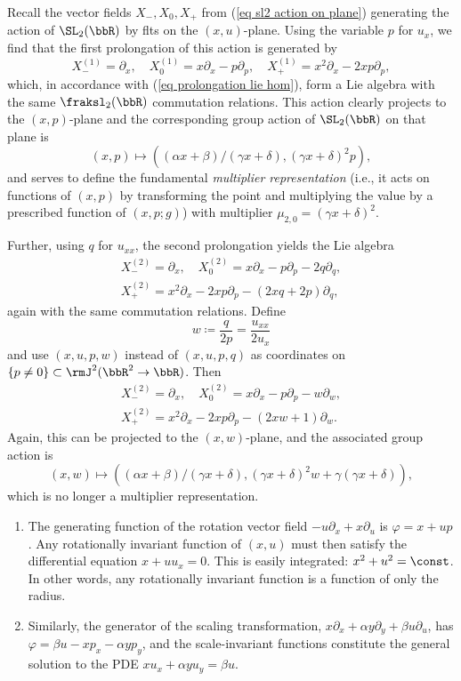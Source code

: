 \begin{example}
    Recall the vector fields $X_-,X_0,X_+$ from (\ref{eq sl2 action on plane}) generating the action of $\SL_2(\bbR)$ by \glspl{flt} on the $(x,u)$-plane. Using the variable $p$ for $u_x$, we find that the first prolongation of this action is generated by 
    \[X_-^{(1)}=\partial_x,\quad X_0^{(1)}=x\partial_x-p\partial_p,\quad X_+^{(1)}=x^2\partial_x-2xp\partial_p,\]
    which, in accordance with (\ref{eq prolongation lie hom}), form a Lie algebra with the same $\fraksl_2(\bbR)$ commutation relations. This action clearly projects to the $(x,p)$-plane and the corresponding group action of $\SL_2(\bbR)$ on that plane is 
    \[(x,p)\mapsto ((\alpha x+\beta)/(\gamma x+\delta),(\gamma x+\delta)^2p),\]
    and serves to define the fundamental \emph{multiplier representation} (i.e., it acts on functions of $(x,p)$ by transforming the point and multiplying the value by a prescribed function of $(x,p;g)$) with multiplier $\mu_{2,0}=(\gamma x+\delta)^2$.

    Further, using $q$ for $u_{xx}$, the second prolongation yields the Lie algebra 
    \begin{gather}
        X_-^{(2)}=\partial_x,\quad X_0^{(2)}=x\partial_x-p\partial_p-2q\partial_q,\\
        X_+^{(2)}=x^2\partial_x-2xp\partial_p-(2xq+2p)\partial_q,
    \end{gather}
    again with the same commutation relations. Define 
    \[w\coloneqq \frac{q}{2p}=\frac{u_{xx}}{2u_x}\]
    and use $(x,u,p,w)$ instead of $(x,u,p,q)$ as coordinates on $\{p\neq 0\}\subset\rmJ^2(\bbR^2\to \bbR)$. Then 
    \begin{gather}
        X_-^{(2)}=\partial_x,\quad X_0^{(2)}=x\partial_x-p\partial_p-w\partial_w,\\
        X_+^{(2)}=x^2\partial_x-2xp\partial_p-(2xw+1)\partial_w.
    \end{gather}
    Again, this can be projected to the $(x,w)$-plane, and the associated group action is 
    \[(x,w)\mapsto ((\alpha x+\beta)/(\gamma x+\delta),(\gamma x+\delta)^2w+\gamma(\gamma x+\delta)),\]
    which is no longer a multiplier representation.
\end{example}


\begin{example}
    \begin{enumerate}
        \item The generating function of the rotation vector field $-u\partial_x+x\partial_u$ is $\varphi=x+up$. Any rotationally invariant function of $(x,u)$ must then satisfy the differential equation $x+uu_x=0$. This is easily integrated: $x^2+u^2=\const$. In other words, any rotationally invariant function is a function of only the radius.
        \item Similarly, the generator of the scaling transformation, $x\partial_x+\alpha y\partial_y+\beta u\partial_u$, has $\varphi=\beta u-xp_x-\alpha y p_y$, and the scale-invariant functions constitute the general solution to the PDE $xu_x+\alpha yu_y=\beta u$.
    \end{enumerate}
\end{example}


